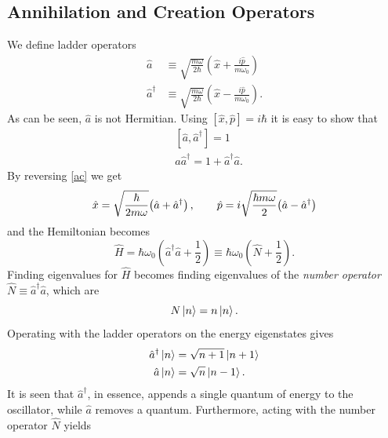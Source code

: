 \subsection{Annihilation and Creation Operators}
\label{sec:ladder-operators}
We define ladder operators
\begin{equation}
\begin{split}
\hat{a} &\equiv \sqrt{\frac{m\omega}{2\hbar}} \left(  \hat{x} + \frac{i\hat{p}}{m\omega_0}  \right) \\
\hat{a}^\dagger &\equiv \sqrt{\frac{m\omega}{2\hbar}}\left(  \hat{x} - \frac{i\hat{p}}{m\omega_0}  \right).
\end{split}\label{ac}
\end{equation}
As can be seen, $\hat{a}$ is not Hermitian. 
Using $\left[ \hat{x}, \hat{p}  \right] = i\hbar$ it is easy to show that
\begin{equation}\label{acom}
\begin{split}
&\left[ \hat{a}, \hat{a}^\dagger  \right] = 1\\
&\hat{a} \hat{a}^\dagger = 1 + \hat{a}^\dagger  \hat{a}.
\end{split}
\end{equation}
By reversing \ref{ac} we get
\begin{equation}\label{xho}
\hat{x} = \sqrt{\frac{\hbar}{2m\omega}}\qty(\hat{a} + \hat{a}^\dagger)\, ,\qquad
\hat{p} = i\sqrt{\frac{\hbar m \omega}{2}} \qty(\hat{a} - \hat{a}^\dagger)
\end{equation}
and the Hemiltonian becomes
\begin{equation}
\hat{H} = \hbar\omega_0\left(  \hat{a}^\dagger  \hat{a}+ \frac{1}{2} \right) \equiv \hbar\omega_0\left( \hat{N} + \frac{1}{2} \right).
\end{equation}
Finding eigenvalues for $\hat{H}$ becomes finding eigenvalues of the \emph{number operator} $\hat{N} \equiv  \hat{a}^\dagger  \hat{a}$, which are
\begin{equation}
N\ket{n}=n\ket{n}.
\end{equation}
Operating with the ladder operators on the energy eigenstates gives
\begin{equation}
\begin{split}
\hat{a}^\dagger \ket{n} &= \sqrt{n+1}\ket{n+1}\\
\hat{a}\ket{n} &= \sqrt{n}\ket{n-1}.
\end{split}
\end{equation}
It is seen that $\hat{a}^\dagger$, in essence, appends a single quantum of energy to the oscillator, while $\hat{a}$ removes a quantum. Furthermore, acting with the number operator $\hat{N}$ yields
